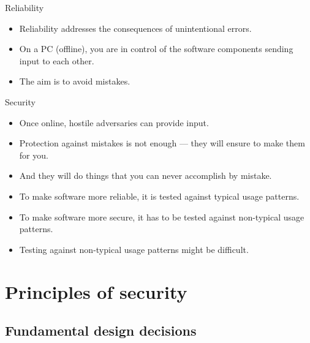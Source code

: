 \begin{frame}
  \begin{block}{Reliability}
    \begin{itemize}
      \item Reliability addresses the consequences of unintentional errors.

      \item On a PC (offline), you are in control of the software components 
        sending input to each other.

      \item The aim is to avoid mistakes.
    \end{itemize}
  \end{block}

  \pause{}

  \begin{block}{Security}
    \begin{itemize}
      \item Once online, hostile adversaries can provide input.

      \item Protection against mistakes is not enough --- they will ensure to 
        make them for you.

      \item And they will do things that you can never accomplish by mistake.
    \end{itemize}
  \end{block}
\end{frame}

\begin{frame}
  \begin{itemize}
    \item To make software more reliable, it is tested against typical usage 
      patterns.

    \item To make software more secure, it has to be tested against non-typical 
      usage patterns.

    \item Testing against non-typical usage patterns might be difficult.
  \end{itemize}
\end{frame}


\section{Principles of security}

\subsection{Fundamental design decisions}

